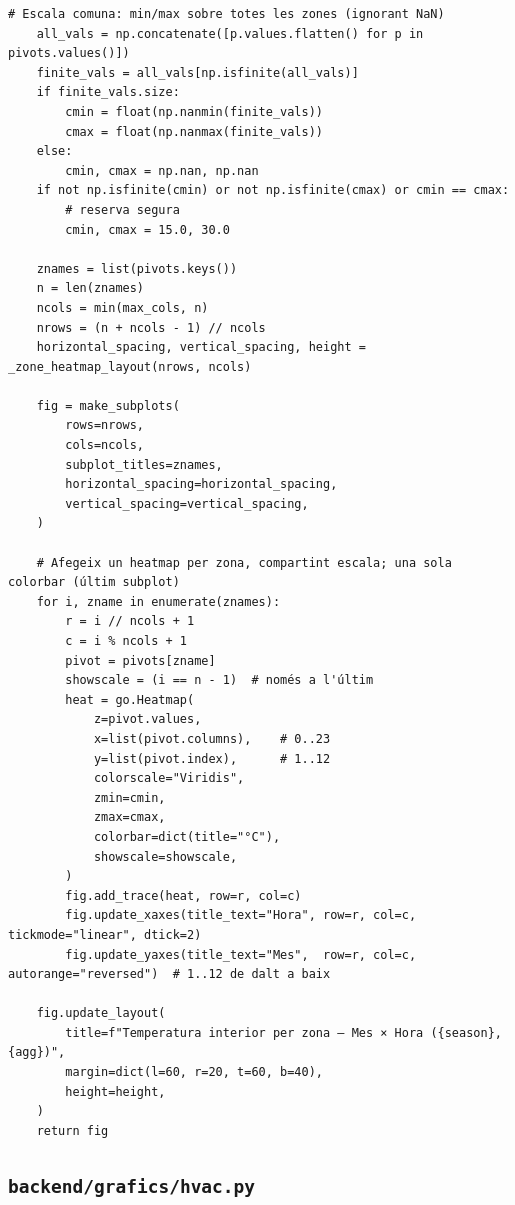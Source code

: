 \documentclass[10pt,a4paper]{article}
\begin{document}
\begin{lstlisting}[style=studioPython,caption={backend/grafics/heatmaps.py},label={lst:backend-grafics-heatmaps-py}]
    # Escala comuna: min/max sobre totes les zones (ignorant NaN)
    all_vals = np.concatenate([p.values.flatten() for p in pivots.values()])
    finite_vals = all_vals[np.isfinite(all_vals)]
    if finite_vals.size:
        cmin = float(np.nanmin(finite_vals))
        cmax = float(np.nanmax(finite_vals))
    else:
        cmin, cmax = np.nan, np.nan
    if not np.isfinite(cmin) or not np.isfinite(cmax) or cmin == cmax:
        # reserva segura
        cmin, cmax = 15.0, 30.0

    znames = list(pivots.keys())
    n = len(znames)
    ncols = min(max_cols, n)
    nrows = (n + ncols - 1) // ncols
    horizontal_spacing, vertical_spacing, height = _zone_heatmap_layout(nrows, ncols)

    fig = make_subplots(
        rows=nrows,
        cols=ncols,
        subplot_titles=znames,
        horizontal_spacing=horizontal_spacing,
        vertical_spacing=vertical_spacing,
    )

    # Afegeix un heatmap per zona, compartint escala; una sola colorbar (últim subplot)
    for i, zname in enumerate(znames):
        r = i // ncols + 1
        c = i % ncols + 1
        pivot = pivots[zname]
        showscale = (i == n - 1)  # només a l'últim
        heat = go.Heatmap(
            z=pivot.values,
            x=list(pivot.columns),    # 0..23
            y=list(pivot.index),      # 1..12
            colorscale="Viridis",
            zmin=cmin,
            zmax=cmax,
            colorbar=dict(title="°C"),
            showscale=showscale,
        )
        fig.add_trace(heat, row=r, col=c)
        fig.update_xaxes(title_text="Hora", row=r, col=c, tickmode="linear", dtick=2)
        fig.update_yaxes(title_text="Mes",  row=r, col=c, autorange="reversed")  # 1..12 de dalt a baix

    fig.update_layout(
        title=f"Temperatura interior per zona – Mes × Hora ({season}, {agg})",
        margin=dict(l=60, r=20, t=60, b=40),
        height=height,
    )
    return fig
\end{lstlisting}


\subsection{\texorpdfstring{\texttt{backend/grafics/hvac.py}}{backend/grafics/hvac.py}}
\end{document}
